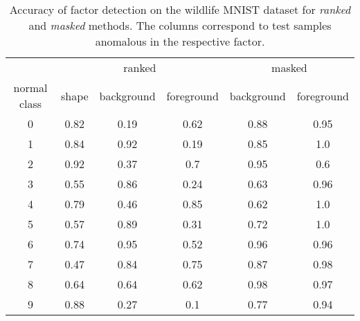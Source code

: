 \begin{table}[h] 
 \center 
 \begin{tabular}{c | c c c | c c}
 \toprule
 & \multicolumn{3}{c|}{ranked} & \multicolumn{2}{c}{masked} \\
  normal class & shape & background & foreground & background & foreground  \\ 
  \midrule 
  0 & 0.82 & 0.19 & 0.62 & 0.88 & 0.95  \\ 
  1 & 0.84 & 0.92 & 0.19 & 0.85 & 1.0  \\ 
  2 & 0.92 & 0.37 & 0.7 & 0.95 & 0.6  \\  
  3 & 0.55 & 0.86 & 0.24 & 0.63 & 0.96  \\
  4 & 0.79 & 0.46 & 0.85 & 0.62 & 1.0  \\ 
  5 & 0.57 & 0.89 & 0.31 & 0.72 & 1.0  \\ 
  6 & 0.74 & 0.95 & 0.52 & 0.96 & 0.96  \\
  7 & 0.47 & 0.84 & 0.75 & 0.87 & 0.98  \\
  8 & 0.64 & 0.64 & 0.62 & 0.98 & 0.97  \\
  9 & 0.88 & 0.27 & 0.1 & 0.77 & 0.94  \\
   \bottomrule
 \end{tabular}
 \caption{Accuracy of factor detection on the wildlife MNIST dataset for \textit{ranked} and \textit{masked} methods. The columns correspond to test samples anomalous in the respective factor.} 
 \label{tab:factor_detection} 
\end{table}